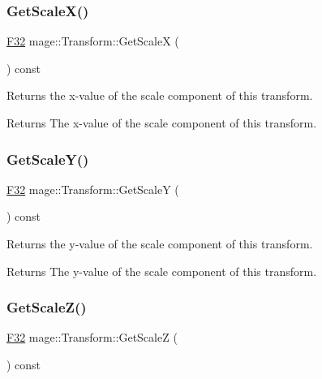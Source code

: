 \subsubsection{\texorpdfstring{Get\+Scale\+X()}{GetScaleX()}}
{\footnotesize\ttfamily \hyperlink{namespacemage_aa97e833b45f06d60a0a9c4fc22ae02c0}{F32} mage\+::\+Transform\+::\+Get\+ScaleX (\begin{DoxyParamCaption}{ }\end{DoxyParamCaption}) const\hspace{0.3cm}{\ttfamily [noexcept]}}

Returns the x-\/value of the scale component of this transform.

\begin{DoxyReturn}{Returns}
The x-\/value of the scale component of this transform. 
\end{DoxyReturn}
\hypertarget{classmage_1_1_transform_a17bd579657e31fbdc1eacec0836140c5}{}\label{classmage_1_1_transform_a17bd579657e31fbdc1eacec0836140c5} 
\subsubsection{\texorpdfstring{Get\+Scale\+Y()}{GetScaleY()}}
{\footnotesize\ttfamily \hyperlink{namespacemage_aa97e833b45f06d60a0a9c4fc22ae02c0}{F32} mage\+::\+Transform\+::\+Get\+ScaleY (\begin{DoxyParamCaption}{ }\end{DoxyParamCaption}) const\hspace{0.3cm}{\ttfamily [noexcept]}}

Returns the y-\/value of the scale component of this transform.

\begin{DoxyReturn}{Returns}
The y-\/value of the scale component of this transform. 
\end{DoxyReturn}
\hypertarget{classmage_1_1_transform_aa7ba1aa16161ec656b2828c2433f6dbd}{}\label{classmage_1_1_transform_aa7ba1aa16161ec656b2828c2433f6dbd} 
\subsubsection{\texorpdfstring{Get\+Scale\+Z()}{GetScaleZ()}}
{\footnotesize\ttfamily \hyperlink{namespacemage_aa97e833b45f06d60a0a9c4fc22ae02c0}{F32} mage\+::\+Transform\+::\+Get\+ScaleZ (\begin{DoxyParamCaption}{ }\end{DoxyParamCaption}) const\hspace{0.3cm}{\ttfamily [noexcept]}}

